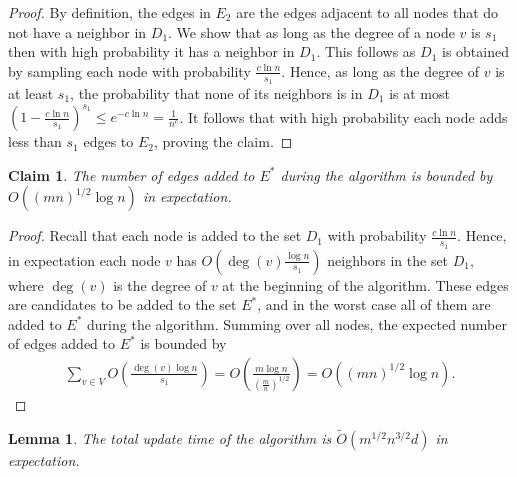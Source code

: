 \documentclass[11pt]{article}
\newtheorem{lemma}[theorem]{Lemma}
\newtheorem{claim}[theorem]{Claim}
\theoremstyle{definition}
\theoremstyle{remark}
\begin{document}
\begin{proof}
By definition, the edges in $E_2$ are the edges adjacent to all nodes that do not have a neighbor in $D_1$. We show that as long as the degree of a node $v$ is $s_1$ then with high probability it has a neighbor in $D_1$. This follows as $D_1$ is obtained by sampling each node with probability $\frac{c \ln{n}}{s_1}$. Hence, as long as the degree of $v$ is at least $s_1$, the probability that none of its neighbors is in $D_1$ is at most $(1-\frac{c\ln{n}}{s_1})^{s_1} \leq e^{-c\ln{n}}=\frac{1}{n^c}$. It follows that with high probability each node adds less than $s_1$ edges to $E_2$, proving the claim.
\end{proof}

\begin{claim} \label{claim_warmup_E*}
The number of edges added to $E^*$ during the algorithm is bounded by $O( (mn)^{1/2}\log{n} )$ in expectation.
\end{claim}

\begin{proof}
Recall that each node is added to the set $D_1$ with probability $\frac{c \ln{n}}{s_1}$. Hence, in expectation each node $v$ has $O(\deg(v) \frac{\log{n}}{s_1})$ neighbors in the set $D_1$, where $\deg(v)$ is the degree of $v$ at the beginning of the algorithm. These edges are candidates to be added to the set $E^*$, and in the worst case all of them are added to $E^*$ during the algorithm. Summing over all nodes, the expected number of edges added to $E^*$ is bounded by 
\begin{align*}
    \sum_{v \in V} O \left( \frac{\deg(v)\log{n}}{s_1} \right) = O \left( \frac{m\log{n}}{(\frac{m}{n})^{1/2}} \right) = O( (mn)^{1/2}\log{n} ).
\end{align*} 
\end{proof}

\begin{lemma}
The total update time of the algorithm is $\tilde{O}(m^{1/2}n^{3/2}d)$ in expectation.
\end{lemma}
\end{document}
